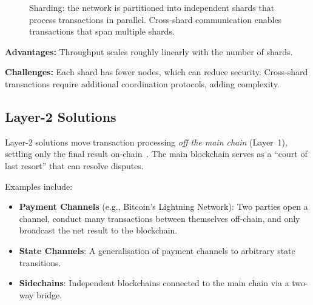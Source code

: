 \begin{figure}[htbp]
\centering
{}
\caption{Sharding: the network is partitioned into independent shards that process transactions in parallel. Cross-shard communication enables transactions that span multiple shards.}
\label{fig:sharding}
\end{figure}

\textbf{Advantages:} Throughput scales roughly linearly with the number of shards.

\textbf{Challenges:} Each shard has fewer nodes, which can reduce security. Cross-shard transactions require additional coordination protocols, adding complexity.

\subsection{Layer-2 Solutions}
\label{sec:layer2}

Layer-2 solutions move transaction processing \emph{off the main chain} (Layer~1), settling only the final result on-chain~\cite{poon2016lightning}. The main blockchain serves as a ``court of last resort'' that can resolve disputes.

Examples include:
\begin{itemize}
    \item \textbf{Payment Channels} (e.g., Bitcoin's Lightning Network): Two parties open a channel, conduct many transactions between themselves off-chain, and only broadcast the net result to the blockchain.
    \item \textbf{State Channels}: A generalisation of payment channels to arbitrary state transitions.
    \item \textbf{Sidechains}: Independent blockchains connected to the main chain via a two-way bridge.
\end{itemize}

